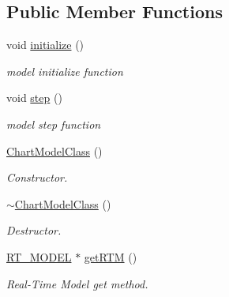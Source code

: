 \subsection*{Public Member Functions}
\begin{DoxyCompactItemize}
\item 
void \mbox{\hyperlink{class_chart_model_class_ab32e055f4e5692dd69685b4befbea75d}{initialize}} ()
\begin{DoxyCompactList}\small\item\em model initialize function \end{DoxyCompactList}\item 
void \mbox{\hyperlink{class_chart_model_class_ab729e721b38bcedeed5b39c2de387413}{step}} ()
\begin{DoxyCompactList}\small\item\em model step function \end{DoxyCompactList}\item 
\mbox{\hyperlink{class_chart_model_class_ac943318da1975acdd0bee749a1372c47}{Chart\+Model\+Class}} ()
\begin{DoxyCompactList}\small\item\em Constructor. \end{DoxyCompactList}\item 
\mbox{\hyperlink{class_chart_model_class_a7b8440da4a5cbe07a6b0433db9a69f99}{$\sim$\+Chart\+Model\+Class}} ()
\begin{DoxyCompactList}\small\item\em Destructor. \end{DoxyCompactList}\item 
\mbox{\hyperlink{_app___stateflow_8h_a6f32dbbab0d15102b3fe6ec3fe6a72ba}{R\+T\+\_\+\+M\+O\+D\+EL}} $\ast$ \mbox{\hyperlink{class_chart_model_class_a77ef9eda8f1e119f93ad3c87b3a54bbd}{get\+R\+TM}} ()
\begin{DoxyCompactList}\small\item\em Real-\/\+Time Model get method. \end{DoxyCompactList}\end{DoxyCompactItemize}
